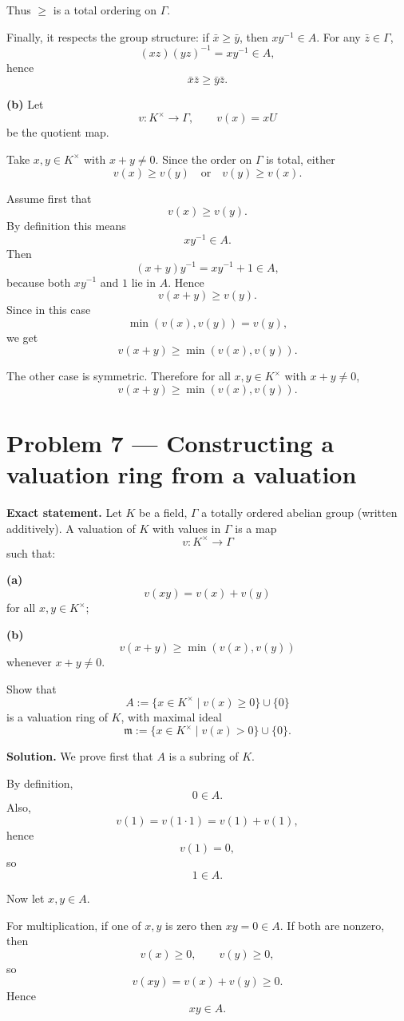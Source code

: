 \documentclass[12pt,a4paper]{article}
\theoremstyle{notespace}
\begin{document}
Thus \(\ge\) is a total ordering on \(\Gamma\).

Finally, it respects the group structure: if \(\bar x\ge \bar y\), then \(xy^{-1}\in A\). For any \(\bar z\in \Gamma\),
\[
(xz)(yz)^{-1}=xy^{-1}\in A,
\]
hence
\[
\bar x\bar z\ge \bar y\bar z.
\]

\medskip

\textbf{(b)} Let
\[
v:K^\times\to \Gamma,\qquad v(x)=xU
\]
be the quotient map.

Take \(x,y\in K^\times\) with \(x+y\neq 0\). Since the order on \(\Gamma\) is total, either
\[
v(x)\ge v(y)
\quad\text{or}\quad
v(y)\ge v(x).
\]

Assume first that
\[
v(x)\ge v(y).
\]
By definition this means
\[
xy^{-1}\in A.
\]
Then
\[
(x+y)y^{-1}=xy^{-1}+1\in A,
\]
because both \(xy^{-1}\) and \(1\) lie in \(A\). Hence
\[
v(x+y)\ge v(y).
\]
Since in this case
\[
\min(v(x),v(y))=v(y),
\]
we get
\[
v(x+y)\ge \min(v(x),v(y)).
\]

The other case is symmetric. Therefore for all \(x,y\in K^\times\) with \(x+y\neq 0\),
\[
v(x+y)\ge \min(v(x),v(y)).
\]

\bigskip

\section{Problem 7 --- Constructing a valuation ring from a valuation}

\textbf{Exact statement.}
Let \(K\) be a field, \(\Gamma\) a totally ordered abelian group (written additively). A valuation of \(K\) with values in \(\Gamma\) is a map
\[
v:K^\times\to \Gamma
\]
such that:

\textbf{(a)}
\[
v(xy)=v(x)+v(y)
\]
for all \(x,y\in K^\times\);

\textbf{(b)}
\[
v(x+y)\ge \min(v(x),v(y))
\]
whenever \(x+y\neq 0\).

Show that
\[
A:=\{x\in K^\times\mid v(x)\ge 0\}\cup\{0\}
\]
is a valuation ring of \(K\), with maximal ideal
\[
\mathfrak m:=\{x\in K^\times\mid v(x)>0\}\cup\{0\}.
\]

\textbf{Solution.}
We prove first that \(A\) is a subring of \(K\).

By definition,
\[
0\in A.
\]
Also,
\[
v(1)=v(1\cdot 1)=v(1)+v(1),
\]
hence
\[
v(1)=0,
\]
so
\[
1\in A.
\]

Now let \(x,y\in A\).

For multiplication, if one of \(x,y\) is zero then \(xy=0\in A\). If both are nonzero, then
\[
v(x)\ge 0,\qquad v(y)\ge 0,
\]
so
\[
v(xy)=v(x)+v(y)\ge 0.
\]
Hence
\[
xy\in A.
\]
\end{document}
